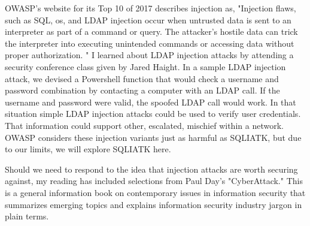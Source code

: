 OWASP's website for its Top 10 of 2017 describes injection as, "Injection flaws, such as SQL, \gls{os}, and LDAP injection occur when untrusted data is sent to an interpreter as part of a command or query. The attacker’s hostile data can trick the interpreter into executing unintended commands or accessing data without proper authorization. "  I learned about LDAP injection attacks by attending a security conference class given by Jared Haight.  In a sample LDAP injection \gls{attack}, we devised a Powershell function that would check a username and \gls{password} combination by contacting a computer with an LDAP call.  If the username and \gls{password} were valid, the spoofed LDAP call would work.  In that situation simple LDAP injection attacks could be used to verify user credentials.  That information could support other, escalated, mischief within a network.  OWASP considers these injection variants just as harmful as SQLIATK, but due to our limits, we will explore SQLIATK here.

Should we need to respond to the idea that injection attacks are worth securing against, my reading has included selections from Paul Day's "CyberAttack."   This is a general information book on contemporary issues in information security that summarizes emerging topics and explains information security industry jargon in plain terms.

